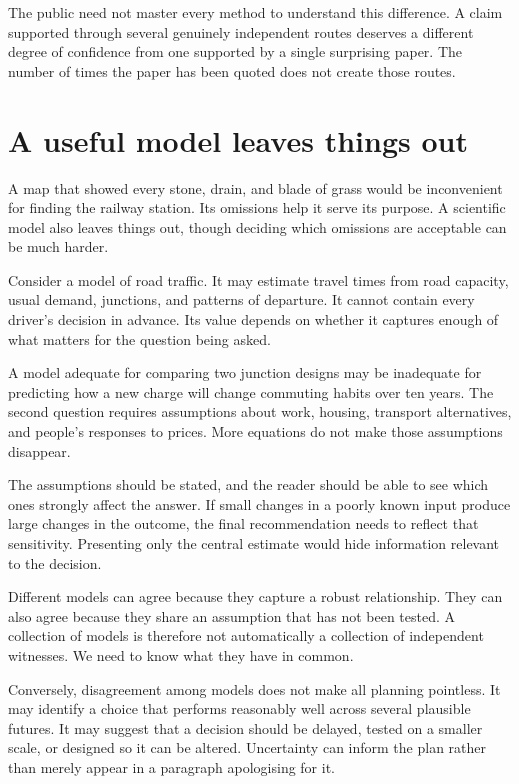 \documentclass[12pt,a4paper]{book}
\begin{document}
The public need not master every method to understand this difference. A claim supported through several genuinely independent routes deserves a different degree of confidence from one supported by a single surprising paper. The number of times the paper has been quoted does not create those routes.

\section*{A useful model leaves things out}

A map that showed every stone, drain, and blade of grass would be inconvenient for finding the railway station. Its omissions help it serve its purpose. A scientific model also leaves things out, though deciding which omissions are acceptable can be much harder.

Consider a model of road traffic. It may estimate travel times from road capacity, usual demand, junctions, and patterns of departure. It cannot contain every driver's decision in advance. Its value depends on whether it captures enough of what matters for the question being asked.

A model adequate for comparing two junction designs may be inadequate for predicting how a new charge will change commuting habits over ten years. The second question requires assumptions about work, housing, transport alternatives, and people's responses to prices. More equations do not make those assumptions disappear.

The assumptions should be stated, and the reader should be able to see which ones strongly affect the answer. If small changes in a poorly known input produce large changes in the outcome, the final recommendation needs to reflect that sensitivity. Presenting only the central estimate would hide information relevant to the decision.

Different models can agree because they capture a robust relationship. They can also agree because they share an assumption that has not been tested. A collection of models is therefore not automatically a collection of independent witnesses. We need to know what they have in common.

Conversely, disagreement among models does not make all planning pointless. It may identify a choice that performs reasonably well across several plausible futures. It may suggest that a decision should be delayed, tested on a smaller scale, or designed so it can be altered. Uncertainty can inform the plan rather than merely appear in a paragraph apologising for it.
\end{document}
